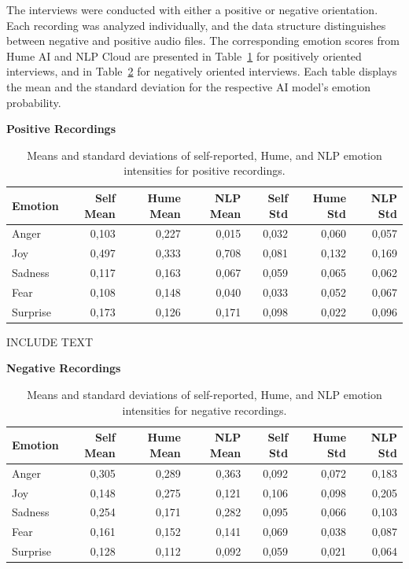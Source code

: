   The interviews were conducted with either a positive or negative orientation. Each recording was analyzed individually, and
  the data structure distinguishes between negative and positive audio files. The corresponding emotion scores from Hume AI and 
  NLP Cloud are presented in Table~\ref{tab:rq3_emotion-stats-pos} for positively oriented interviews, and in Table~\ref{tab:rq3_emotion-stats_neg}
  for negatively oriented interviews. Each table displays the mean and the standard deviation for the respective AI model's emotion probability. 
  \begin{table}[H]
    \centering
    \caption*{\textbf{Positive Recordings}}
    \begin{tabular}{lrrrrrr}
      \toprule
      \textbf{Emotion} & \textbf{Self Mean} & \textbf{Hume Mean} & \textbf{NLP Mean} & \textbf{Self Std} & \textbf{Hume Std} & \textbf{NLP Std} \\
      \midrule
      Anger    & 0,103 & 0,227 & 0,015 & 0,032 & 0,060 & 0,057 \\
      Joy      & 0,497 & 0,333 & 0,708 & 0,081 & 0,132 & 0,169 \\
      Sadness  & 0,117 & 0,163 & 0,067 & 0,059 & 0,065 & 0,062 \\
      Fear     & 0,108 & 0,148 & 0,040 & 0,033 & 0,052 & 0,067 \\
      Surprise & 0,173 & 0,126 & 0,171 & 0,098 & 0,022 & 0,096 \\
      \bottomrule
    \end{tabular}
    \caption{Means and standard deviations of self-reported, Hume, and NLP emotion intensities for positive recordings.}
    \label{tab:rq3_emotion-stats-pos}
  \end{table}
  
INCLUDE TEXT 

\begin{table}[H]
    \centering
    \caption*{\textbf{Negative Recordings}}
    \begin{tabular}{lrrrrrr}
      \toprule
      \textbf{Emotion} & \textbf{Self Mean} & \textbf{Hume Mean} & \textbf{NLP Mean} & \textbf{Self Std} & \textbf{Hume Std} & \textbf{NLP Std} \\
      \midrule
      Anger    & 0,305 & 0,289 & 0,363 & 0,092 & 0,072 & 0,183 \\
      Joy      & 0,148 & 0,275 & 0,121 & 0,106 & 0,098 & 0,205 \\
      Sadness  & 0,254 & 0,171 & 0,282 & 0,095 & 0,066 & 0,103 \\
      Fear     & 0,161 & 0,152 & 0,141 & 0,069 & 0,038 & 0,087 \\
      Surprise & 0,128 & 0,112 & 0,092 & 0,059 & 0,021 & 0,064 \\
      \bottomrule
    \end{tabular}
    \caption{Means and standard deviations of self-reported, Hume, and NLP emotion intensities for negative recordings.}
    \label{tab:rq3_emotion-stats_neg}
  \end{table}



